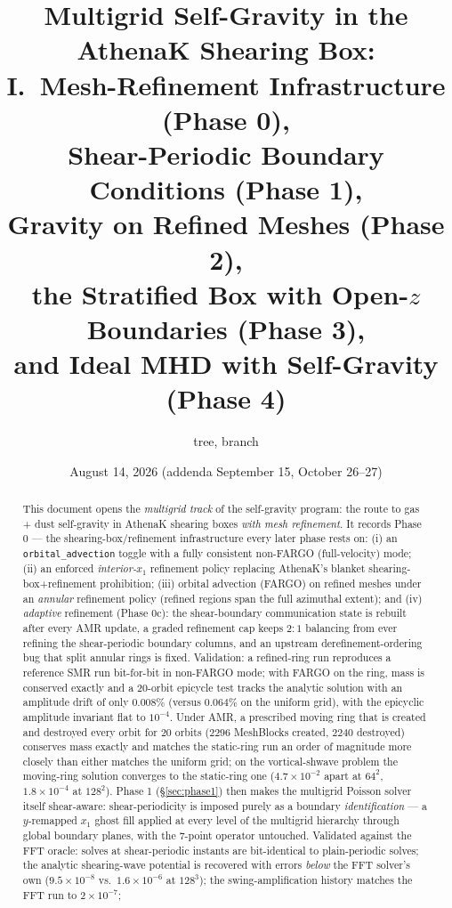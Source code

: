 \documentclass[11pt]{article}
\title{Multigrid Self-Gravity in the AthenaK Shearing Box:\\
       I.\ Mesh-Refinement Infrastructure (Phase 0),\\
       Shear-Periodic Boundary Conditions (Phase 1),\\
       Gravity on Refined Meshes (Phase 2),\\
       the Stratified Box with Open-$z$ Boundaries (Phase 3),\\
       and Ideal MHD with Self-Gravity (Phase 4)}
\author{\code{athenak-multigrid} tree, branch \code{multigrid}}
\date{August 14, 2026 (addenda September 15, October 26--27)}
\newcommand{\code}[1]{\texttt{#1}}
\begin{document}
\maketitle

\begin{abstract}
\noindent
This document opens the \emph{multigrid track} of the self-gravity program: the route
to gas + dust self-gravity in AthenaK shearing boxes \emph{with mesh refinement}. It
records Phase 0 --- the shearing-box/refinement infrastructure every later phase rests
on: (i) an \code{orbital\_advection} toggle with a fully consistent non-FARGO
(full-velocity) mode; (ii) an enforced \emph{interior-$x_1$} refinement policy replacing
AthenaK's blanket shearing-box+refinement prohibition; (iii) orbital advection
(FARGO) on refined meshes under an \emph{annular} refinement policy (refined regions
span the full azimuthal extent); and (iv) \emph{adaptive} refinement (Phase 0c): the
shear-boundary communication state is rebuilt after every AMR update, a graded
refinement cap keeps $2{:}1$ balancing from ever refining the shear-periodic boundary
columns, and an upstream derefinement-ordering bug that split annular rings is fixed.
Validation: a refined-ring run reproduces a reference
SMR run bit-for-bit in non-FARGO mode; with FARGO on the ring, mass is conserved
exactly and a 20-orbit epicycle test tracks the analytic solution with an amplitude
drift of only $0.008\%$ (versus $0.064\%$ on the uniform grid), with the epicyclic
amplitude invariant flat to $10^{-4}$. Under AMR, a prescribed moving ring that is
created and destroyed every orbit for 20 orbits ($2296$ MeshBlocks created, $2240$
destroyed) conserves mass exactly and matches the static-ring run an order of
magnitude more closely than either matches the uniform grid; on the vortical-shwave
problem the moving-ring solution converges to the static-ring one
($4.7\times10^{-2}$ apart at $64^2$, $1.8\times10^{-4}$ at $128^2$).
Phase 1 (\S\ref{sec:phase1}) then makes the multigrid Poisson solver itself
shear-aware: shear-periodicity is imposed purely as a boundary \emph{identification}
--- a $y$-remapped $x_1$ ghost fill applied at every level of the multigrid hierarchy
through global boundary planes, with the 7-point operator untouched. Validated
against the FFT oracle: solves at shear-periodic instants are bit-identical to
plain-periodic solves; the analytic shearing-wave potential is recovered with errors
\emph{below} the FFT solver's own ($9.5\times10^{-8}$ vs.\ $1.6\times10^{-6}$ at
$128^3$); the swing-amplification history matches the FFT run to $2\times10^{-7}$;

\end{abstract}
\end{document}
